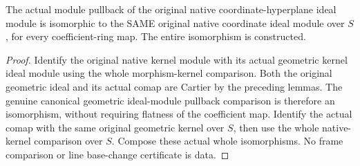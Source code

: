 \begin{theorem}
\label{projective:actual-coordinate-hyperplane-native-module-pullback}
\leanok
{}
The actual module pullback of the original native coordinate-hyperplane ideal
module is isomorphic to the SAME original native coordinate ideal module over
$S$, for every coefficient-ring map. The entire isomorphism is constructed.
\end{theorem}
\begin{proof}
Identify the original native kernel module with its actual geometric kernel
ideal module using the whole morphism-kernel comparison. Both the original
geometric ideal and its actual comap are Cartier by the preceding lemmas.
The genuine canonical geometric ideal-module pullback comparison is therefore
an isomorphism, without requiring flatness of the coefficient map. Identify
the actual comap with the same original geometric kernel over $S$, then use
the whole native-kernel comparison over $S$. Compose these actual whole
isomorphisms. No frame comparison or line base-change certificate is data.
\end{proof}
